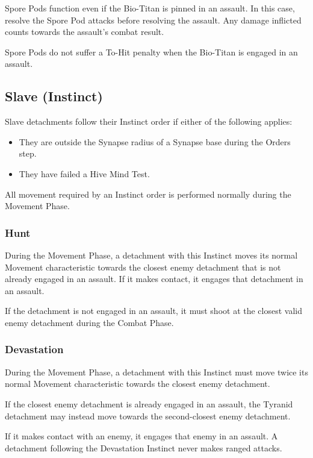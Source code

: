 Spore Pods function even if the Bio-Titan is pinned in an assault. In this case, resolve the Spore Pod attacks before resolving the assault. Any damage inflicted counts towards the assault's combat result.

Spore Pods do not suffer a To-Hit penalty when the Bio-Titan is engaged in an assault.

\subsection{Slave (Instinct)}

Slave detachments follow their Instinct order if either of the following applies:

\begin{itemize}
    \item They are outside the Synapse radius of a Synapse base during the Orders step.
    \item They have failed a Hive Mind Test.
\end{itemize}

All movement required by an Instinct order is performed normally during the Movement Phase.

\subsubsection{Hunt}

During the Movement Phase, a detachment with this Instinct moves its normal Movement characteristic towards the closest enemy detachment that is not already engaged in an assault. If it makes contact, it engages that detachment in an assault.

If the detachment is not engaged in an assault, it must shoot at the closest valid enemy detachment during the Combat Phase.

\subsubsection{Devastation}

During the Movement Phase, a detachment with this Instinct must move twice its normal Movement characteristic towards the closest enemy detachment.

If the closest enemy detachment is already engaged in an assault, the Tyranid detachment may instead move towards the second-closest enemy detachment.

If it makes contact with an enemy, it engages that enemy in an assault. A detachment following the Devastation Instinct never makes ranged attacks.

